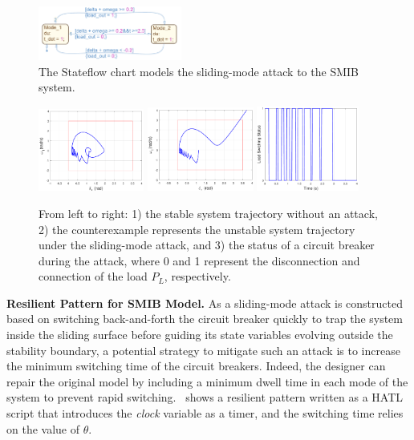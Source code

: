 \begin{figure}[t!]%
	\centering%
    \includegraphics[width=0.42\textwidth]{image/smib_attack_model}%
	\caption{The Stateflow chart models the sliding-mode attack to the SMIB system.}%
\end{figure}%


\begin{figure}[t!]%
	\centering%
    \includegraphics[width=0.31\textwidth]{image/normal}%
		\includegraphics[width=0.31\textwidth]{image/counter}%
		\includegraphics[width=0.3\textwidth]{image/load_v2}%
	\caption{From left to right: 1) the stable system trajectory without an attack, 2) the counterexample represents the unstable system trajectory under the sliding-mode attack, and 3) the status of a circuit breaker during the attack, where 0 and 1 represent the disconnection and connection of the load $P_L$, respectively.}%
\end{figure}%

\vspace{0.5em}
\noindent
{\bf Resilient Pattern for SMIB Model.} 
As a sliding-mode attack is constructed based on switching back-and-forth the circuit breaker quickly to trap the system inside the sliding surface before guiding its state variables evolving outside the stability boundary, a potential strategy to mitigate such an attack is to increase the minimum switching time of the circuit breakers. Indeed, the designer can repair the original model by including a minimum dwell time in each mode of the system to prevent rapid switching.~ shows a resilient pattern written as a HATL script that introduces the \emph{clock} variable as a timer, and the switching time relies on the value of $\theta$.

